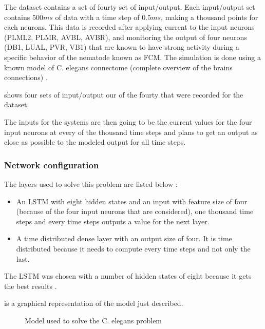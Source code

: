 The dataset contains a set of fourty set of input/output. Each input/output set contains $500ms$ of data with a time step of $0.5ms$, making a thousand points for each neurons. This data is recorded after applying current to the input neurons (PLML2, PLMR, AVBL, AVBR), and monitoring the output of four neurons (DB1, LUAL, PVR, VB1) that are known to have strong activity during  a specific behavior of the nematode known as \ac{FCM}. The simulation is done using a known model of \ac{C. elegans} connectome (complete overview of the brains connections) \cite{celegans}.

 shows four sets of input/output our of the fourty that were recorded for the dataset.

The inputs for the systems are then going to be the current values for the four input neurons at every of the thousand time steps and plans to get an output as close as possible to the modeled output for all time steps.

\subsubsection{Network configuration}

The layers used to solve this problem are listed below :

\begin{itemize}
  \item An \ac{LSTM} with eight hidden states and an input with feature size of four (because of the four input neurons that are considered), one thousand time steps and every time steps outputs a value for the next layer.
  \item A time distributed dense layer with an output size of four. It is time distributed because it needs to compute every time steps and not only the last.
\end{itemize}

The \ac{LSTM} was chosen with a number of hidden states of eight because it gets the best results \cite{celegans}.

 is a graphical representation of the model just described.

\begin{figure}[H]
  \centering
  
  \caption{Model used to solve the \ac{C. elegans} problem}
  \label{fig:celegansModel}
\end{figure}
